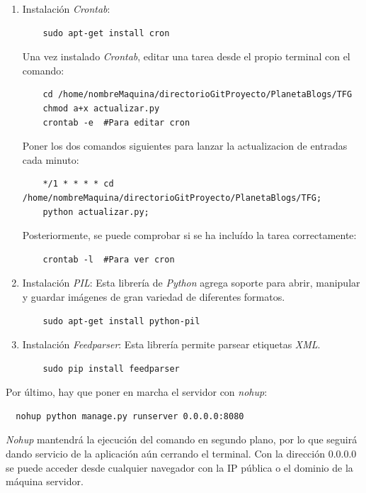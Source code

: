 \documentclass[a4paper, 12pt]{book}
\begin{document}
\begin{enumerate}
  ''STATICFILES\_DIRS'' y la ruta de los ficheros multimedia ''MEDIA\_ROOT''. Cambiar la ra\'iz por la ruta:
    {\footnotesize\begin{verbatim} 
    /home/nombreMaquina/directorioGitProyecto/PlanetaBlogs/TFG \end{verbatim}}
  \item Instalaci\'on \textit{Crontab}:
    {\footnotesize\begin{verbatim} 
    sudo apt-get install cron \end{verbatim}}
  Una vez instalado \textit{Crontab}, editar una tarea desde el propio terminal con el comando:
    {\footnotesize\begin{verbatim} 
    cd /home/nombreMaquina/directorioGitProyecto/PlanetaBlogs/TFG
    chmod a+x actualizar.py
    crontab -e 	#Para editar cron\end{verbatim}}
  Poner los dos comandos siguientes para lanzar la actualizacion de entradas cada minuto:
    {\footnotesize\begin{verbatim} 
    */1 * * * * cd /home/nombreMaquina/directorioGitProyecto/PlanetaBlogs/TFG; 
    python actualizar.py; \end{verbatim}}
  Posteriormente, se puede comprobar si se ha inclu\'ido la tarea correctamente:
    {\footnotesize\begin{verbatim} 
    crontab -l 	#Para ver cron \end{verbatim}}
  \item Instalaci\'on \textit{PIL}: Esta librer\'ia de \textit{Python} agrega soporte para abrir, manipular y guardar im\'agenes de gran variedad de 
  diferentes formatos.
    {\footnotesize\begin{verbatim} 
    sudo apt-get install python-pil \end{verbatim}}
  \item Instalaci\'on \textit{Feedparser}: Esta librer\'ia permite parsear etiquetas \textit{XML}.
    {\footnotesize\begin{verbatim} 
    sudo pip install feedparser \end{verbatim}}
\end{enumerate}
Por \'ultimo, hay que poner en marcha el servidor con \textit{nohup}:
  {\footnotesize\begin{verbatim} 
  nohup python manage.py runserver 0.0.0.0:8080\end{verbatim}}
\textit{Nohup} mantendr\'a la ejecuci\'on del comando en segundo plano, por lo que seguir\'a dando servicio de la aplicaci\'on a\'un cerrando el terminal. 
Con la direcci\'on 0.0.0.0 se puede acceder desde cualquier navegador con la IP p\'ublica o el dominio de la m\'aquina servidor.
\end{document}
